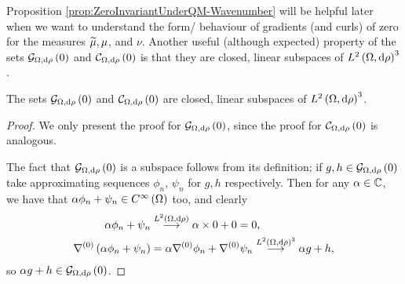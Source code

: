 Proposition \ref{prop:ZeroInvariantUnderQM-Wavenumber} will be helpful later  when we want to understand the form/ behaviour of gradients (and curls) of zero for the measures $\widetilde{\mu}, \mu$, and $\nu$.
Another useful (although expected) property of the sets $\mathcal{G}_{ \Omega, \mathrm{d}\rho}\left( 0 \right)$ and $\mathcal{C}_{ \Omega, \mathrm{d}\rho}\left( 0 \right)$ is that they are closed, linear subspaces of $L^{2}\left( \Omega,\mathrm{d}\rho \right)^3$.
\begin{prop}
	The sets $\mathcal{G}_{ \Omega, \mathrm{d}\rho}\left( 0 \right)$ and $\mathcal{C}_{ \Omega, \mathrm{d}\rho}\left( 0 \right)$ are closed, linear subspaces of $L^{2}\left( \Omega,\mathrm{d}\rho \right)^3$.
\end{prop}
\begin{proof}
	We only present the proof for $\mathcal{G}_{ \Omega, \mathrm{d}\rho}\left( 0 \right)$, since the proof for $\mathcal{C}_{ \Omega, \mathrm{d}\rho}\left( 0 \right)$ is analogous.
	
	The fact that $\mathcal{G}_{ \Omega, \mathrm{d}\rho}\left( 0 \right)$ is a subspace follows from its definition; if $g, h\in\mathcal{G}_{ \Omega, \mathrm{d}\rho}\left( 0 \right)$ take approximating sequences $\phi_n$, $\psi_n$ for $g,h$ respectively.
	Then for any $\alpha\in\mathbb{C}$, we have that $\alpha\phi_n + \psi_n\in C^{\infty}\left( \Omega \right)$ too, and clearly
	\begin{align*}
		\alpha\phi_n + \psi_n &\overset{L^{2}\left( \Omega,\mathrm{d}\rho \right)}{\longrightarrow} \alpha\times 0 + 0 = 0, \\
		\nabla^{(0)}\left( \alpha\phi_n + \psi_n \right) &= \alpha\nabla^{(0)}\phi_n + \nabla^{(0)}\psi_n
		\overset{L^{2}\left( \Omega,\mathrm{d}\rho \right)^3}{\longrightarrow} \alpha g + h,
	\end{align*}
	so $\alpha g + h\in\mathcal{G}_{ \Omega, \mathrm{d}\rho}\left( 0 \right)$.
	

\end{proof}
